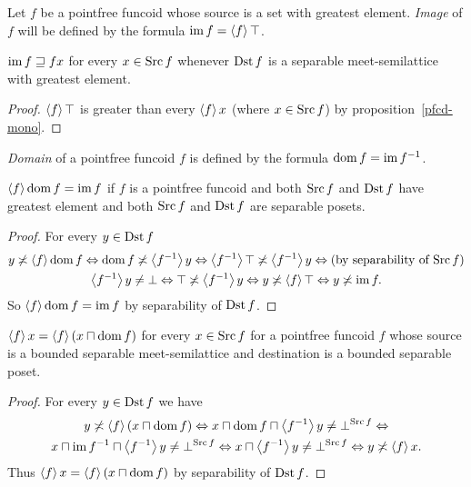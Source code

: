 \begin{defn}
Let $f$ be a pointfree funcoid whose
source is a set with greatest element. \emph{Image} of $f$ will be
defined by the formula $\operatorname{im} f=\left\langle f\right\rangle\top$.\end{defn}
\begin{obvious}
$\operatorname{im} f\sqsupseteq fx$ for every $x\in\operatorname{Src} f$ whenever $\operatorname{Dst} f$
is a separable meet-semilattice with greatest element.\end{obvious}
\begin{proof}
$\left\langle f\right\rangle\top$ is greater than every $\left\langle f\right\rangle x$ (where $x\in\operatorname{Src} f$)
by proposition~\ref{pfcd-mono}.\end{proof}
\begin{defn}
\emph{Domain} of a pointfree funcoid
$f$ is defined by the formula $\operatorname{dom} f=\operatorname{im} f^{-1}$.\end{defn}
\begin{prop}
$\left\langle f\right\rangle\operatorname{dom} f=\operatorname{im} f$ if $f$ is a pointfree funcoid and both $\operatorname{Src} f$
and $\operatorname{Dst} f$ have greatest element and both $\operatorname{Src} f$
and $\operatorname{Dst} f$ are separable posets.\end{prop}
\begin{proof}
For every $y\in\operatorname{Dst} f$
\begin{multline*}
y\not\asymp\left\langle f\right\rangle\operatorname{dom} f\Leftrightarrow\operatorname{dom} f\not\asymp\left\langle f^{-1}\right\rangle y\Leftrightarrow\left\langle f^{-1}\right\rangle\top\not\asymp\left\langle f^{-1}\right\rangle y\Leftrightarrow
\text{(by separability of $\operatorname{Src} f$)}\\
\left\langle f^{-1}\right\rangle y\ne\bot\Leftrightarrow\top\not\asymp\left\langle f^{-1}\right\rangle y\Leftrightarrow y\not\asymp\left\langle f\right\rangle\top\Leftrightarrow y\not\asymp\operatorname{im} f.
\end{multline*}
So $\left\langle f\right\rangle\operatorname{dom} f=\operatorname{im} f$ by separability of $\operatorname{Dst} f$.\end{proof}
\begin{prop}
$\left\langle f\right\rangle x=\left\langle f\right\rangle(x\sqcap\operatorname{dom} f)$
for every $x\in\operatorname{Src} f$ for a pointfree funcoid $f$ whose source
is a bounded separable meet-semilattice and destination is a bounded separable poset.\end{prop}
\begin{proof}
For every $y\in\operatorname{Dst} f$ we have
\begin{multline*}
y\not\asymp\left\langle f\right\rangle(x\sqcap\operatorname{dom} f)\Leftrightarrow x\sqcap\operatorname{dom} f\sqcap\left\langle f^{-1}\right\rangle y\ne\bot^{\operatorname{Src} f}\Leftrightarrow\\
x\sqcap\operatorname{im} f^{-1}\sqcap\left\langle f^{-1}\right\rangle y\ne\bot^{\operatorname{Src} f}\Leftrightarrow x\sqcap\left\langle f^{-1}\right\rangle y\ne\bot^{\operatorname{Src} f}\Leftrightarrow y\not\asymp\left\langle f\right\rangle x.
\end{multline*}
Thus $\left\langle f\right\rangle x=\left\langle f\right\rangle(x\sqcap\operatorname{dom} f)$ by separability of $\operatorname{Dst} f$.\end{proof}
